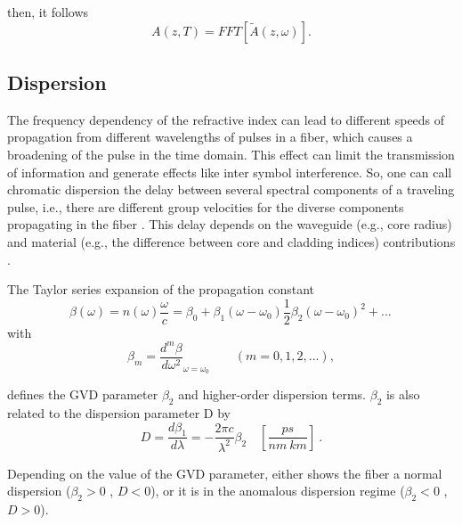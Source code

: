         then, it follows
        \begin{equation} \label{eq_deffft}
                A(z,T) = FFT \left[ \tilde{A}(z,\omega) \right].
            \end{equation}
            
            
    \subsection{Dispersion}
        The frequency dependency of the refractive index can lead to different speeds of propagation from different wavelengths of pulses in a fiber, which causes a broadening of the pulse in the time domain. This effect can limit the transmission of information and generate effects like inter symbol interference.  So, one can call chromatic dispersion the delay between several spectral components of a traveling pulse, i.e., there are different group velocities for the diverse components propagating in the fiber  \citep{Udayakumar2013ChromaticDC}. This delay depends on the waveguide (e.g., core radius) and material (e.g., the difference between core and cladding indices) contributions \citep{dudley_taylor_2010}. 
        
        The Taylor series expansion of the propagation constant 
        \begin{equation}
             \beta(\omega) = n (\omega)\frac{\omega}{c} = \beta_0 + \beta_1(\omega-\omega_0) \frac{1}{2}\beta_2(\omega-\omega_0)^2+...\, 
             \label{eq_betas}
        \end{equation}
        with 
        \begin{equation}
            \beta_m = \frac{d^m\beta}{d\omega^2}_{\omega = \omega_0} \qquad (m = 0,1,2,...),
            \label{eq_dbeta}
        \end{equation}
        
        
        defines the \gls{GVD} parameter $\beta_2$  and higher-order dispersion terms.  $\beta_2$ is also related to the dispersion parameter D by
        \begin{equation}
            D = \frac{d\beta_1}{d\lambda} = - \frac{2\pi c}{\lambda^2}\beta_2 \quad [\frac{ps}{nm \ km}] \ .
            \label{eq_Ds}
        \end{equation}
        
        Depending on the value of the \Gls{GVD} parameter, either shows the fiber a normal dispersion ($\beta_2 > 0$ , $D<0$), or it is in the anomalous dispersion regime ($\beta_2 < 0$ , $D>0$).
        
